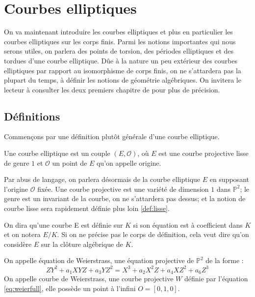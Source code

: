 \documentclass[a4paper]{article} %
\numberwithin{section}{part}
\numberwithin{equation}{section}
\newcommand\EO{\mathcal{O}}
\newcommand\PP[1]{\mathbb{P}^{#1}}
\begin{document}
\section{Courbes elliptiques}
On va maintenant introduire les courbes elliptiques et plus en particulier les
courbes elliptiques sur les corps finis. Parmi les notions importantes qui nous
serons utiles, on parlera des points de torsion, des périodes elliptiques et des
tordues d'une courbe elliptique. Dûe à la nature un peu extérieur des courbes
elliptiques par rapport au isomorphisme de corps finis, on ne s'attardera pas 
la plupart du temps, à définir les notions de géométrie algébriques. On invitera
le lecteur à consulter les deux premiers chapitre de \cite{Sil} pour plus de
précision.

\subsection{Définitions}
Commençons par une définition plutôt générale d'une courbe elliptique.

\begin{defn}
Une courbe elliptique est un couple $(E, \EO)$, où $E$ est une courbe 
projective lisse de genre $1$ et $\EO$ un point de $E$ qu'on appelle origine.
\end{defn}

Par abus de langage, on parlera désormais de la courbe elliptique $E$ en
supposant l'origine $\EO$ fixée. Une courbe projective est une variété de
dimension $1$ dans $\PP{2}$; le genre est un invariant de la courbe, on ne
s'attardera pas dessus; et la notion de courbe lisse sera rapidement définie
plus loin \ref{def:lisse}.\par
On dira qu'une courbe E est définie 
sur $K$ si son équation est à coefficient dans $K$ et on notera $E/K$. Si on ne
précise pas le corps de définition, cela veut dire qu'on considère $E$ sur la
clôture algébrique de $K$.

\begin{defn} 
On appelle équation de Weierstrass, une équation projective de $\PP{2}$ de la
forme :
\begin{equation}
\label{eq:weierfull}
ZY^2 + a_1XYZ + a_3YZ^2 = X^3 + a_2X^2Z + a_4XZ^2 + a_6Z^3
\end{equation}
On appelle courbe de Weierstrass, une courbe projective $W$ définie par 
l'équation \ref{eq:weierfull}, elle possède un point à l'infini $O = 
[0, 1, 0]$.
\end{defn}
\end{document}
